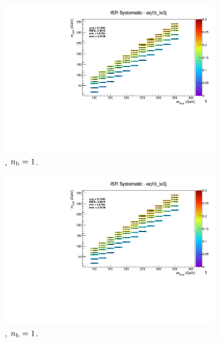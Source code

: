\begin{figure}[ht!]
\begin{subfigure}[b]{0.32\textwidth}
    \includegraphics[width=\textwidth, page=8]{Figs/sms/t2cc/v37/systs_v2/T2cc_ISR_eq1b_le3j.pdf}
    \caption{\njlow, $n_{\text{b}} = 1$.}
  \end{subfigure}
  \begin{subfigure}[b]{0.32\textwidth}
    \includegraphics[width=\textwidth, page=1]{Figs/sms/t2cc/v37/systs_v2/T2cc_ISR_eq1b_le3j.pdf}
    \caption{\njlow, $n_{\text{b}} = 1$.}
  \end{subfigure}\\
  \begin{subfigure}[b]{0.32\textwidth}

\end{subfigure}
\end{figure}
